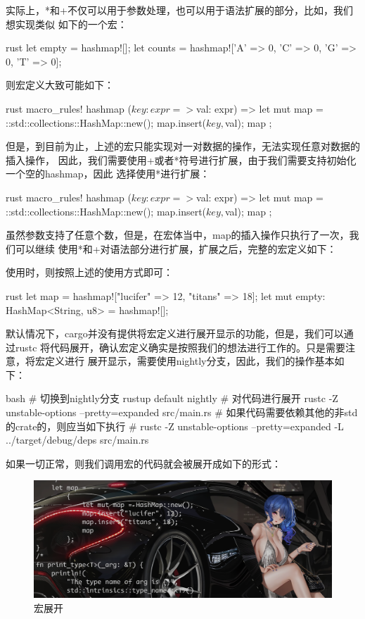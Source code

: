 实际上，*和+不仅可以用于参数处理，也可以用于语法扩展的部分，比如，我们想实现类似
如下的一个宏：
\begin{code-block}{rust}
let empty = hashmap![];
let counts = hashmap!['A' => 0, 'C' => 0, 'G' => 0, 'T' => 0];
\end{code-block}
则宏定义大致可能如下：
\begin{code-block}{rust}
macro_rules! hashmap {
    ($key: expr => $val: expr) => {{
        let mut map = ::std::collections::HashMap::new();
        map.insert($key, $val);
        map
    }};
}
\end{code-block}
但是，到目前为止，上述的宏只能实现对一对数据的操作，无法实现任意对数据的插入操作，
因此，我们需要使用+或者*符号进行扩展，由于我们需要支持初始化一个空的hashmap，因此
选择使用*进行扩展：
\begin{code-block}{rust}
macro_rules! hashmap {
    ($key: expr => $val: expr) => {{
        let mut map = ::std::collections::HashMap::new();
        map.insert($key, $val);
        map
    }};
}
\end{code-block}
虽然参数支持了任意个数，但是，在宏体当中，map的插入操作只执行了一次，我们可以继续
使用*和+对语法部分进行扩展，扩展之后，完整的宏定义如下：
使用时，则按照上述的使用方式即可：
\begin{code-block}{rust}
let map = hashmap!["lucifer" => 12, "titans" => 18];
let mut empty: HashMap<String, u8> = hashmap![];
\end{code-block}
默认情况下，cargo并没有提供将宏定义进行展开显示的功能，但是，我们可以通过rustc
将代码展开，确认宏定义确实是按照我们的想法进行工作的。只是需要注意，将宏定义进行
展开显示，需要使用nightly分支，因此，我们的操作基本如下：
\begin{code-block}{bash}
# 切换到nightly分支
rustup default nightly
# 对代码进行展开
rustc -Z unstable-options --pretty=expanded src/main.rs
# 如果代码需要依赖其他的非std的crate的，则应当如下执行
# rustc -Z unstable-options --pretty=expanded -L ../target/debug/deps src/main.rs
\end{code-block}
如果一切正常，则我们调用宏的代码就会被展开成如下的形式：
\begin{figure}[H]
  \centering
  \includegraphics[width=\linewidth]{rust_macro_expand.png}
  \caption{宏展开}
  \label{fig:rust_macro_expand}
\end{figure}


